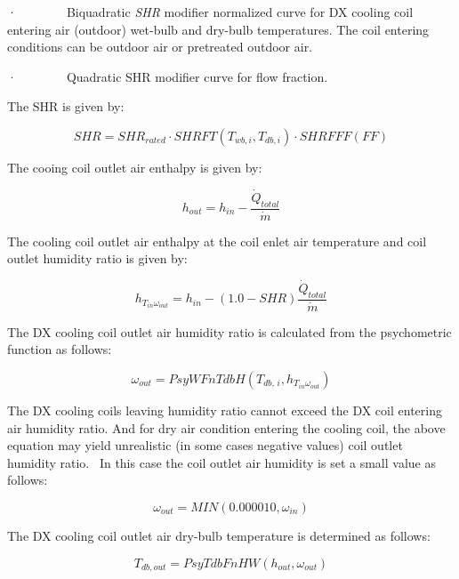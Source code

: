 ·~~~~~~~~Biquadratic \emph{SHR} modifier normalized curve for DX cooling coil entering air (outdoor) wet-bulb and dry-bulb temperatures. The coil entering conditions can be outdoor air or pretreated outdoor air.

·~~~~~~~~Quadratic SHR modifier curve for flow fraction.

The SHR is given by:

\begin{equation}
SHR = SH{R_{rated}} \cdot SHRFT\left( {{T_{wb,i}},{T_{db,i}}} \right) \cdot SHRFFF\left( {FF} \right)
\end{equation}

The cooing coil outlet air enthalpy is given by:

\begin{equation}
{h_{out}} = {h_{in}} - \frac{{{{\dot Q}_{total}}}}{{\dot m}}
\end{equation}

The cooling coil outlet air enthalpy at the coil enlet air temperature and coil outlet humidity ratio is given by:

\begin{equation}
{h_{{T_{in}}{\omega_{out}}}} = {h_{in}} - \left( {1.0 - SHR} \right)\frac{{{{\dot Q}_{total}}}}{{\dot m}}
\end{equation}

The DX cooling coil outlet air humidity ratio is calculated from the psychometric function as follows:

\begin{equation}
{\omega_{out}} = PsyWFnTdbH\left( {{T_{db,\,i}},{h_{{T_{in}}{\omega_{out}}}}} \right)
\end{equation}

The DX cooling coils leaving humidity ratio cannot exceed the DX coil entering air humidity ratio. And for dry air condition entering the cooling coil, the above equation may yield unrealistic (in some cases negative values) coil outlet humidity ratio.~ In this case the coil outlet air humidity is set a small value as follows:

\begin{equation}
{\omega_{out}} = MIN\left( {0.000010,{\omega_{in}}} \right)
\end{equation}

The DX cooling coil outlet air dry-bulb temperature is determined as follows:

\begin{equation}
{T_{db,out}} = PsyTdbFnHW\left( {{h_{out}},{\omega_{out}}} \right)
\end{equation}

